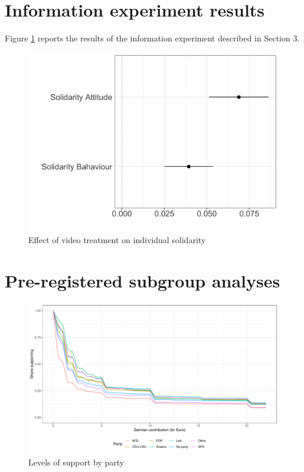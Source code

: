 \documentclass[]{article}
\begin{document}


\clearpage
\section{Information experiment results}

Figure \ref{fig:video} reports the results of the information experiment described in Section 3.

\begin{figure}[hbt!]
	\includegraphics[width=\linewidth]{../Figures/fig_video.png}
	\caption{Effect of video treatment on individual solidarity}
	\label{fig:video}
\end{figure}

\newpage

\newpage
\section{Pre-registered subgroup analyses}

\begin{figure}[hbt!]
	\includegraphics[width=\linewidth]{"../2_output/cumulative_by_party.pdf"}
	\caption{Levels of support by party}
	\label{fig:cuma}
\end{figure}
\end{document}
